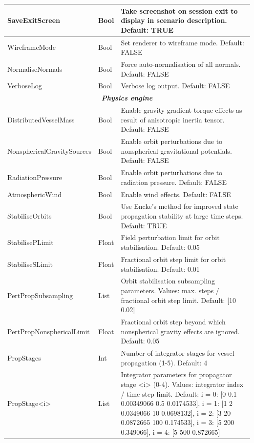 \documentclass[Orbiter User Manual.tex]{subfiles}
\begin{document}
\begin{longtable}{ |p{}|p{}|p{}| }
	\hline\rule{0pt}{2ex}
	SaveExitScreen & Bool & Take screenshot on session exit to display in scenario description. Default: TRUE\\
	\hline\rule{0pt}{2ex}
	WireframeMode & Bool & Set renderer to wireframe mode. Default: FALSE\\
	\hline\rule{0pt}{2ex}
	NormaliseNormals & Bool & Force auto-normalisation of all normals. Default: FALSE\\
	\hline\rule{0pt}{2ex}
	VerboseLog & Bool & Verbose log output. Default: FALSE\\
	\hline
	\multicolumn{3}{|c|}{\rule{0pt}{2ex}\textbf{\textit{Physics engine}}}\\
	\hline\rule{0pt}{2ex}
	DistributedVesselMass & Bool & Enable gravity gradient torque effects as result of anisotropic inertia tensor. Default: FALSE\\
	\hline\rule{0pt}{2ex}
	NonsphericalGravitySources & Bool & Enable orbit perturbations due to nonspherical gravitational potentials. Default: FALSE\\
	\hline\rule{0pt}{2ex}
	RadiationPressure & Bool & Enable orbit perturbations due to radiation pressure. Default: FALSE\\
	\hline\rule{0pt}{2ex}
	AtmosphericWind & Bool & Enable wind effects. Default: FALSE\\
	\hline\rule{0pt}{2ex}
	StabiliseOrbits & Bool & Use Encke's method for improved state propagation stability at large time steps. Default: TRUE\\
	\hline\rule{0pt}{2ex}
	StabilisePLimit & Float & Field perturbation limit for orbit stabilisation. Default: 0.05\\
	\hline\rule{0pt}{2ex}
	StabiliseSLimit & Float & Fractional orbit step limit for orbit stabilisation. Default: 0.01\\
	\hline\rule{0pt}{2ex}
	PertPropSubsampling & List & Orbit stabilisation subsampling parameters. Values: max. steps / fractional orbit step limit. Default: [10 0.02]\\
	\hline\rule{0pt}{2ex}
	PertPropNonsphericalLimit & Float & Fractional orbit step beyond which nonspherical gravity effects are ignored. Default: 0.05\\
	\hline\rule{0pt}{2ex}
	PropStages & Int & Number of integrator stages for vessel propagation (1-5). Default: 4\\
	\hline\rule{0pt}{2ex}
	PropStage<i> & List & Integrator parameters for propagator stage <i> (0-4). Values: integrator index / time step limit. Default: i = 0: [0 0.1 0.00349066 0.5 0.0174533], i = 1: [1 2 0.0349066 10 0.0698132], i = 2: [3 20 0.0872665 100 0.174533], i = 3: [5 200 0.349066], i = 4: [5 500 0.872665]\\

\end{longtable}
\end{document}
